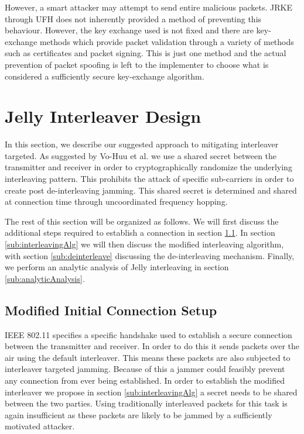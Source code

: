\documentclass[sigconf]{acmart}
\begin{document}
However, a smart attacker may attempt to send entire malicious packets. JRKE through UFH does not inherently provided a method of preventing this behaviour. However, the key exchange used is not fixed and there are key-exchange methods which provide packet validation through a variety of methods such as certificates and packet signing. This is just one method and the actual prevention of packet spoofing is left to the implementer to choose what is considered a sufficiently secure key-exchange algorithm.

\section{Jelly Interleaver Design}
\label{sec:interleaver_design}

In this section, we describe our suggested approach to mitigating interleaver targeted. As suggested by Vo-Huu et al. we use a shared secret between the transmitter and receiver in order to cryptographically randomize the underlying interleaving pattern\cite{vo2016interleaving}. This prohibits the attack of specific sub-carriers in order to create post de-interleaving jamming. This shared secret is determined and shared at connection time through uncoordinated frequency hopping. 

The rest of this section will be organized as follows. We will first discuss the additional steps required to establish a connection in section \ref{sub:setup}. In section \ref{sub:interleavingAlg} we will then discuss the modified interleaving algorithm, with section \ref{sub:deinterleave} discussing the de-interleaving mechanism. Finally, we perform an analytic analysis of Jelly interleaving in section \ref{sub:analyticAnalysis}.

\subsection{Modified Initial Connection Setup}
\label{sub:setup}

IEEE 802.11 specifies a specific handshake used to establish a secure connection between the transmitter and receiver. In order to do this it sends packets over the air using the default interleaver\cite{cooklev2004wireless}. This means these packets are also subjected to interleaver targeted jamming. Because of this a jammer could feasibly prevent any connection from ever being established. In order to establish the modified interleaver we propose in section \ref{sub:interleavingAlg} a secret needs to be shared between the two parties. Using traditionally interleaved packets for this task is again insufficient as these packets are likely to be jammed by a sufficiently motivated attacker. 
\end{document}
